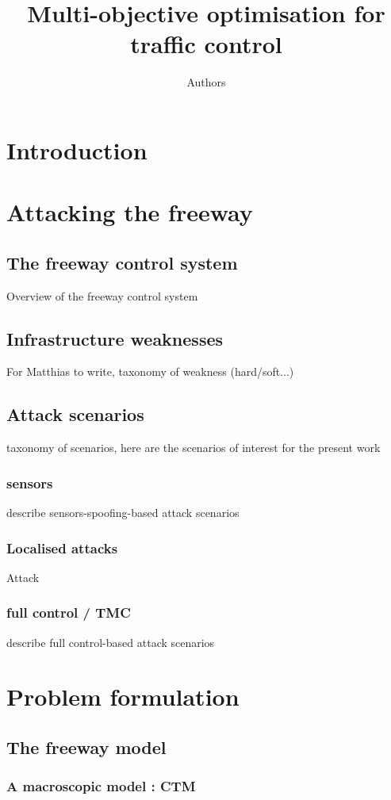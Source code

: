 \documentclass[11pt, oneside]{article}   	%
\title{Multi-objective optimisation for traffic control}
\author{Authors}
\date{}							%
\begin{document}
\maketitle
\tableofcontents

\section*{Introduction}
\section{Attacking the freeway}
	\subsection{The freeway control system}
		Overview of the freeway control system
	\subsection{Infrastructure weaknesses}
		For Matthias to write, taxonomy of weakness (hard/soft...)
	\subsection{Attack scenarios}
		taxonomy of scenarios, here are the scenarios of interest for the present work
		\subsubsection{sensors}
			describe sensors-spoofing-based attack scenarios
		\subsubsection{Localised attacks}
			Attack
		\subsubsection{full control / TMC}
			describe full control-based attack scenarios
\section{Problem formulation}			
	\subsection{The freeway model}
		\subsubsection{A macroscopic model : CTM}
\end{document}
